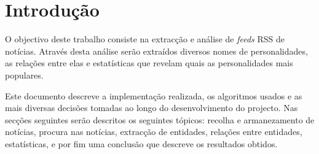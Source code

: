 \section{Introdução}
O objectivo deste trabalho consiste na extracção e análise de \textit{feeds} RSS de notícias. Através desta análise serão extraídos diversos nomes de personalidades, as relações entre elas e estatísticas que revelam quais as personalidades mais populares.

Este documento descreve a implementação realizada, os algoritmos usados e as mais diversas decisões tomadas ao longo do desenvolvimento do projecto. Nas secções seguintes serão descritos os seguintes tópicos: recolha e armanezamento de notícias, procura nas notícias, extracção de entidades, relações entre entidades, estatísticas, e por fim uma conclusão que descreve os resultados obtidos.